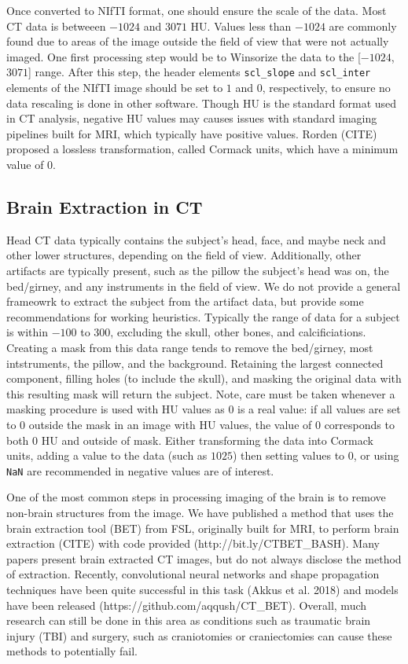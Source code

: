 \documentclass[]{elsarticle} %
\begin{document}
Once converted to NIfTI format, one should ensure the scale of the data.
Most CT data is betweeen \(-1024\) and \(3071\) HU. Values less than
\(-1024\) are commonly found due to areas of the image outside the field
of view that were not actually imaged. One first processing step would
be to Winsorize the data to the {[}\(-1024\), \(3071\){]} range. After
this step, the header elements \texttt{scl\_slope} and
\texttt{scl\_inter} elements of the NIfTI image should be set to \(1\)
and \(0\), respectively, to ensure no data rescaling is done in other
software. Though HU is the standard format used in CT analysis, negative
HU values may causes issues with standard imaging pipelines built for
MRI, which typically have positive values. Rorden (CITE) proposed a
lossless transformation, called Cormack units, which have a minimum
value of \(0\).

\hypertarget{brain-extraction-in-ct}{%
\subsection{Brain Extraction in CT}\label{brain-extraction-in-ct}}

Head CT data typically contains the subject's head, face, and maybe neck
and other lower structures, depending on the field of view.
Additionally, other artifacts are typically present, such as the pillow
the subject's head was on, the bed/girney, and any instruments in the
field of view. We do not provide a general frameowrk to extract the
subject from the artifact data, but provide some recommendations for
working heuristics. Typically the range of data for a subject is within
\(-100\) to \(300\), excluding the skull, other bones, and
calcificiations. Creating a mask from this data range tends to remove
the bed/girney, most intstruments, the pillow, and the background.
Retaining the largest connected component, filling holes (to include the
skull), and masking the original data with this resulting mask will
return the subject. Note, care must be taken whenever a masking
procedure is used with HU values as \(0\) is a real value: if all values
are set to \(0\) outside the mask in an image with HU values, the value
of \(0\) corresponds to both \(0\) HU and outside of mask. Either
transforming the data into Cormack units, adding a value to the data
(such as \(1025\)) then setting values to \(0\), or using \texttt{NaN}
are recommended in negative values are of interest.

One of the most common steps in processing imaging of the brain is to
remove non-brain structures from the image. We have published a method
that uses the brain extraction tool (BET) from FSL, originally built for
MRI, to perform brain extraction (CITE) with code provided
(http://bit.ly/CTBET\_BASH). Many papers present brain extracted CT
images, but do not always disclose the method of extraction. Recently,
convolutional neural networks and shape propagation techniques have been
quite successful in this task (Akkus et al. 2018) and models have been
released (https://github.com/aqqush/CT\_BET). Overall, much research can
still be done in this area as conditions such as traumatic brain injury
(TBI) and surgery, such as craniotomies or craniectomies can cause these
methods to potentially fail.
\end{document}
